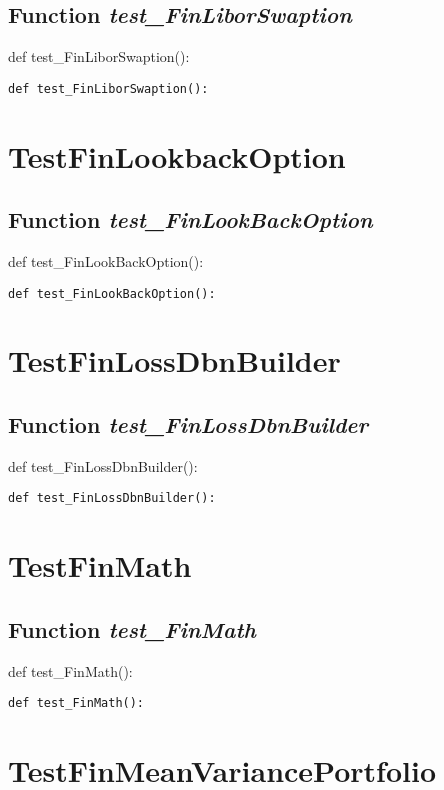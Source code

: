 \documentclass[twoside,11pt]{book}
\begin{document}
\subsection{Function {\it test\_FinLiborSwaption}}
def test\_FinLiborSwaption():

\begin{lstlisting}
def test_FinLiborSwaption():
\end{lstlisting}


\newpage
\section{TestFinLookbackOption}

\subsection{Function {\it test\_FinLookBackOption}}
def test\_FinLookBackOption():

\begin{lstlisting}
def test_FinLookBackOption():
\end{lstlisting}


\newpage
\section{TestFinLossDbnBuilder}

\subsection{Function {\it test\_FinLossDbnBuilder}}
def test\_FinLossDbnBuilder():

\begin{lstlisting}
def test_FinLossDbnBuilder():
\end{lstlisting}


\newpage
\section{TestFinMath}

\subsection{Function {\it test\_FinMath}}
def test\_FinMath():

\begin{lstlisting}
def test_FinMath():
\end{lstlisting}


\newpage
\section{TestFinMeanVariancePortfolio}
\end{document}
